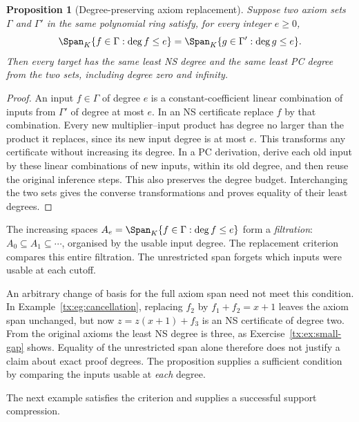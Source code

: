 \documentclass[11pt,a4paper,oneside,openany]{book}
\newtheorem{proposition}[theorem]{Proposition}
\theoremstyle{definition}\newtheorem{definition}[theorem]{Definition}
\theoremstyle{remark}\newtheorem{remark}[theorem]{Remark}
\numberwithin{equation}{chapter}
\begin{document}
\begin{proposition}[Degree-preserving axiom replacement]\label{tx:prop:filtered-replacement}
Suppose two axiom sets $\Gamma$ and $\Gamma'$ in the same polynomial
ring satisfy, for every integer $e\ge0$,
\[
 \Span_K\{f\in\Gamma:\deg f\le e\}
       =\Span_K\{g\in\Gamma':\deg g\le e\}.
\]
Then every target has the same least NS degree and the same least PC
degree from the two sets, including degree zero and infinity.
\end{proposition}
\begin{proof}
An input $f\in\Gamma$ of degree $e$ is a constant-coefficient linear
combination of inputs from $\Gamma'$ of degree at most $e$. In an NS
certificate replace $f$ by that combination. Every new multiplier--input
product has degree no larger than the product it replaces, since its
new input degree is at most $e$. This transforms any certificate
without increasing its degree. In a PC derivation, derive each old
input by these linear combinations of new inputs, within its old
degree, and then reuse the original inference steps. This also
preserves the degree budget. Interchanging the two sets gives the
converse transformations and proves equality of their least degrees.
\end{proof}

The increasing spaces
$A_e=\Span_K\{f\in\Gamma:\deg f\le e\}$ form a \emph{filtration}:
$A_0\subseteq A_1\subseteq\cdots$, organised by the usable input degree.
The replacement criterion compares this entire filtration.
The unrestricted span forgets which inputs were usable at each cutoff.

An arbitrary change of basis for the full axiom span need not meet this
condition. In Example~\ref{tx:eg:cancellation}, replacing $f_2$ by
$f_1+f_2=x+1$ leaves the axiom span unchanged, but now
$z=z(x+1)+f_3$ is an NS certificate of degree two. From the original
axioms the least NS degree is three, as Exercise~\ref{tx:ex:small-gap}
shows. Equality of the unrestricted span alone therefore does not
justify a claim about exact proof degrees. The proposition supplies
a sufficient condition by comparing the inputs usable at \emph{each}
degree.

The next example satisfies the criterion and supplies a successful
support compression.
\end{document}
